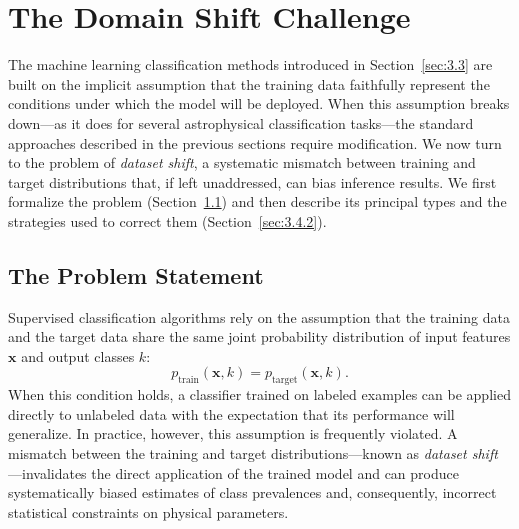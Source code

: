 \section{The Domain Shift Challenge}
\label{sec:3.4}

The machine learning classification methods introduced in Section~\ref{sec:3.3} are built on the implicit assumption that the training data faithfully represent the conditions under which the model will be deployed.
When this assumption breaks down---as it does for several astrophysical classification tasks---the standard approaches described in the previous sections require modification.
We now turn to the problem of \textit{dataset shift}, a systematic mismatch between training and target distributions that, if left unaddressed, can bias inference results.
We first formalize the problem (Section~\ref{sec:3.4.1}) and then describe its principal types and the strategies used to correct them (Section~\ref{sec:3.4.2}).

\subsection{The Problem Statement}
\label{sec:3.4.1}

Supervised classification algorithms rely on the assumption that the training data and the target data share the same joint probability distribution of input features $\mathbf{x}$ and output classes $k$:
\begin{equation}
	p_{\text{train}}(\mathbf{x}, k) = p_{\text{target}}(\mathbf{x}, k).
	\label{eq:dataset_shift_assumption}
\end{equation}
When this condition holds, a classifier trained on labeled examples can be applied directly to unlabeled data with the expectation that its performance will generalize.
In practice, however, this assumption is frequently violated.
A mismatch between the training and target distributions---known as \textit{dataset shift} \cite{MorenoTorres2012AUV}---invalidates the direct application of the trained model and can produce systematically biased estimates of class prevalences and, consequently, incorrect statistical constraints on physical parameters.

